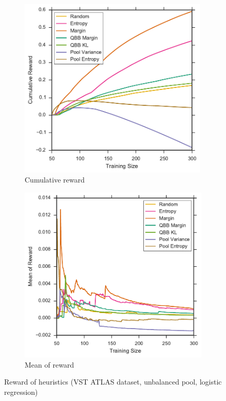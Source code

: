 \begin{figure}[p]
	\centering
	\begin{subfigure}{.5\textwidth}
		\centering
		\includegraphics[width=0.99\textwidth]{figures/5_thompson/vstatlas_ul_sum_rewards}
		\caption{Cumulative reward}
		\label{fig:vstatlas_ul_sum_rewards}
	\end{subfigure}%
	\begin{subfigure}{.5\textwidth}
		\centering
		\includegraphics[width=0.99\linewidth]{figures/5_thompson/vstatlas_ul_avg_rewards}
		\caption{Mean of reward}
		\label{fig:vstatlas_ul_avg_rewards}
	\end{subfigure}
	\caption[Reward of heuristics (VST ATLAS, unbalanced, logistic)]{
		Reward of heuristics (VST ATLAS dataset, unbalanced pool, logistic regression)}
	\label{fig:vstatlas_ul_rewards}
\end{figure}

